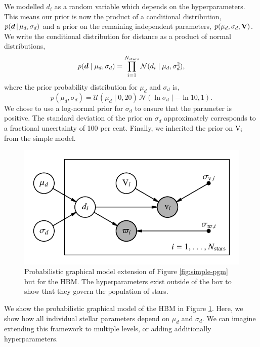 We modelled \(d_i\) as a random variable which depends on the hyperparameters. This means our prior is now the product of a conditional distribution, \(p(\bm{d} \,|\, \mu_d, \sigma_d)\) and a prior on the remaining independent parameters, \(p(\mu_d, \sigma_d, \bm{\mathrm{V}})\). We write the conditional distribution for distance as a product of normal distributions,
%
\begin{equation}
    p(\bm{d} \mid \mu_d, \sigma_d) = \prod_{i=1}^{N_\mathrm{stars}} \mathcal{N}(d_i \mid \mu_d, \sigma_d^2),
\end{equation}
%
where the prior probability distribution for \(\mu_d\) and \(\sigma_d\) is,
%
\begin{equation}
    p(\mu_d, \sigma_d) = \mathcal{U}(\mu_d \mid 0, 20) \, \mathcal{N}(\ln\sigma_d \mid - \ln 10, 1).
\end{equation}
%
We chose to use a log-normal prior for \(\sigma_d\) to ensure that the parameter is positive. The standard deviation of the prior on \(\sigma_d\) approximately corresponds to a fractional uncertainty of 100 per cent. Finally, we inherited the prior on \(\mathrm{V}_i\) from the simple model.

\begin{figure}[tb]
    \centering
    \includegraphics{figures/hbm-pgm.pdf}
    \caption{Probabilistic graphical model extension of Figure \ref{fig:simple-pgm} but for the HBM. The hyperparameters exist outside of the box to show that they govern the population of stars.}
    \label{fig:hbm-pgm}
\end{figure}

We show the probabilistic graphical model of the HBM in Figure \ref{fig:hbm-pgm}. Here, we show how all individual stellar parameters depend on \(\mu_d\) and \(\sigma_d\). We can imagine extending this framework to multiple levels, or adding additionally hyperparameters.

